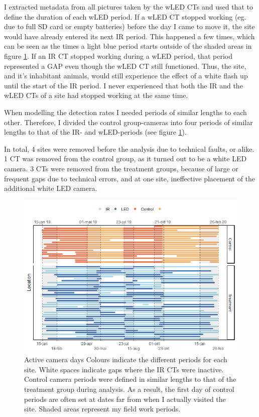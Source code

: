 I extracted metadata from all pictures taken by the wLED CTs and used that to define the duration of each wLED period.
If a wLED CT stopped working (eg. due to full SD card or empty batteries) before the day I came to move it, the site would have already entered its next IR period.
This happened a few times, which can be seen as the times a light blue period starts outside of the shaded areas in figure \ref{fig:timeseries}.
If an IR CT stopped working during a wLED period, that period represented a GAP even though the wLED CT still functioned. Thus, the site, and it's inhabitant animals, would still experience the effect of a white flash up until the start of the IR period.
I never experienced that both the IR and the wLED CTs of a site had stopped working at the same time.

When modelling the detection rates I needed periods of similar lengths to each other. Therefore, I divided the control group-cameras into four periods of similar lengths to that of the IR- and wLED-periods (see figure \ref{fig:timeseries}). 


In total, 4 sites were removed before the analysis due to technical faults, or alike.
1 CT was removed from the control group, as it turned out to be a white LED camera.
3 CTs were removed from the treatment groups, because of large or frequent gaps due to technical errors, and at one site, ineffective placement of the additional white LED camera. 



\begin{figure}
		\centering
		\includegraphics[scale=.8]{../R/FLM_notebook_files/figure-gfm/effort-facet-1.png}	
\caption[Active camera days]
{Active camera days %
Colours indicate the different periods for each site. White spaces indicate gaps where the IR CTs were inactive. Control camera periods were defined in similar lengths to that of the treatment group during analysis. As a result, the first day of control periods are often set at dates far from when I actually visited the site. Shaded areas represent my field work periods. \label{fig:timeseries}}
\end{figure}


